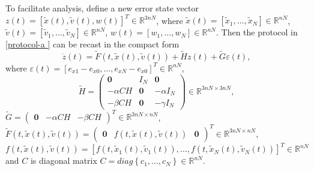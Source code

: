 \documentclass[review]{elsarticle}
\begin{document}
To facilitate analysis, define a new error state vector $z(t)=[\tilde{x}(t),\tilde{v}(t),{w}(t)]^T \in \mathbb{R}^{3nN}$, where $\tilde{x}(t) = [\tilde{x}_1,\ldots,\tilde{x }_N] \in \mathbb{R}^{nN}$, $\tilde{v}(t) = [\tilde{v}_1,\ldots,\tilde{v}_N]\in \mathbb{R}^{nN}$, ${w}(t) = [{w}_1,\ldots,{w}_N]\in \mathbb{R}^{nN}$. Then the protocol in \eqref{protocol-a } can be recast in the compact form 
\begin{equation}\label{compact-close}
\dot { z}(t) =\widetilde{F}(t,\tilde{x}(t),\tilde{v}(t))+ \widetilde H  z(t) + \widetilde{G} \varepsilon(t),
\end{equation}
where $\varepsilon(t) = [e_{x1} - e_{x0}, \ldots, e_{xN} - e_{x0}]^T\in \mathbb{R}^{nN}$,
$$
\widetilde{H} = \begin{pmatrix}
\textbf{0}&	I_N&				\textbf{0}\\
-\alpha C H &\textbf{0}& -\alpha I_N\\
- \beta CH	&		\textbf{0}		&-\gamma I_N
\end{pmatrix}\in  \mathbb{R}^{3nN\times 3nN}, $$
$\widetilde{G} = \begin{pmatrix}\textbf{0}&-\alpha CH&- \beta C H\end{pmatrix}^T \in \mathbb{R}^{3nN\times nN}$, $\widetilde{F}(t,\tilde{x}(t),\tilde{v}(t))=\begin{pmatrix}\textbf{0}&f\left(t,\tilde{x} (t),\tilde{v}(t) \right)&\textbf{0}\end{pmatrix}^T\in \mathbb{R}^{3nN\times nN}$,
$f\left(t,\tilde{x}(t),\tilde{v}(t) \right)= \left[f\left(t,\tilde{x}_1(t),\tilde{v}_1(t)\right),\ldots,f\left(t,\tilde{x}_N(t),\tilde{v}_N(t) \right)  \right]^T \in \mathbb{R}^{nN} $ and $C$ is diagonal matrix $C=diag\left\lbrace c_1 ,\ldots,c_N \right\rbrace \in \mathbb{R}^{nN}$. 
\end{document}
